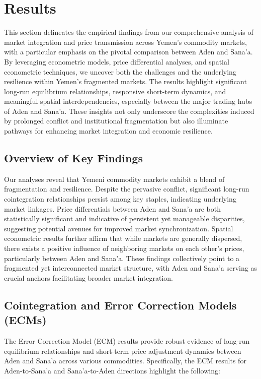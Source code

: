 \section{Results}

This section delineates the empirical findings from our comprehensive analysis of market integration and price transmission across Yemen's commodity markets, with a particular emphasis on the pivotal comparison between Aden and Sana'a. By leveraging econometric models, price differential analyses, and spatial econometric techniques, we uncover both the challenges and the underlying resilience within Yemen's fragmented markets. The results highlight significant long-run equilibrium relationships, responsive short-term dynamics, and meaningful spatial interdependencies, especially between the major trading hubs of Aden and Sana'a. These insights not only underscore the complexities induced by prolonged conflict and institutional fragmentation but also illuminate pathways for enhancing market integration and economic resilience.

\subsection{Overview of Key Findings}

Our analyses reveal that Yemeni commodity markets exhibit a blend of fragmentation and resilience. Despite the pervasive conflict, significant long-run cointegration relationships persist among key staples, indicating underlying market linkages. Price differentials between Aden and Sana'a are both statistically significant and indicative of persistent yet manageable disparities, suggesting potential avenues for improved market synchronization. Spatial econometric results further affirm that while markets are generally dispersed, there exists a positive influence of neighboring markets on each other's prices, particularly between Aden and Sana'a. These findings collectively point to a fragmented yet interconnected market structure, with Aden and Sana'a serving as crucial anchors facilitating broader market integration.

\subsection{Cointegration and Error Correction Models (ECMs)}

The Error Correction Model (ECM) results provide robust evidence of long-run equilibrium relationships and short-term price adjustment dynamics between Aden and Sana'a across various commodities. Specifically, the ECM results for Aden-to-Sana'a and Sana'a-to-Aden directions highlight the following:

